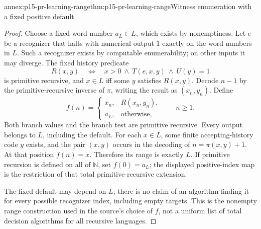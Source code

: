 \begin{annexitem}{annex:p15-pr-learning-range}{thm:p15-pr-learning-range}{Witness enumeration with a fixed positive default}
\begin{proof}
Choose a fixed word number \(a_L\in L\), which exists
by nonemptiness. Let \(e\) be a recognizer that halts
with numerical output \(1\) exactly on the word numbers
in \(L\). Such a recognizer exists by computable
enumerability; on other inputs it may diverge.
The fixed history predicate
\[
 R(x,y)\quad\Longleftrightarrow\quad
 x>0\ \land\ T(e,x,y)\ \land\ U(y)=1
\]
is primitive recursive, and
\(x\in L\) iff some \(y\) satisfies \(R(x,y)\).
Decode \(n-1\) by the primitive-recursive inverse
of \(\pi\), writing the result as \((x_n,y_n)\).
Define
\[
 f(n)=
 \begin{cases}
 x_n,&R(x_n,y_n),\\
 a_L,&\text{otherwise},
 \end{cases}
 \qquad n\geq1.
 \tag{PR.4}
\]
Both branch values and the branch test are primitive
recursive. Every output belongs to \(L\), including
the default. For each \(x\in L\), some finite
accepting-history code \(y\) exists, and the pair
\((x,y)\) occurs in the decoding of
\(n=\pi(x,y)+1\). At that position \(f(n)=x\).
Therefore its range is exactly \(L\).
If primitive recursion is defined on all of \(\mathbb N\),
set \(f(0)=a_L\); the displayed positive-index map is the
restriction of that total primitive-recursive extension.

The fixed default may depend on \(L\); there is no
claim of an algorithm finding it for every possible
recognizer index, including empty targets.
This is the nonempty range construction used in
the source's choice of \(f\), not a uniform list
of total decision algorithms for all recursive languages.
\end{proof}
\end{annexitem}

